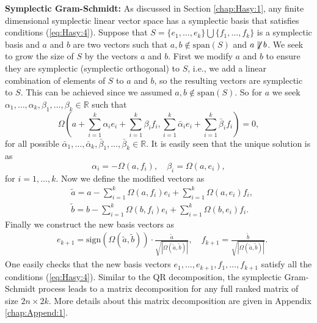 {\bf Symplectic Gram-Schmidt:} As discussed in Section \ref{chap:Hasy:1}, any finite dimensional symplectic linear vector space has a symplectic basis that satisfies conditions (\ref{eq:Hasy:4}). Suppose that $S=\{ e_1 , \dots , e_k \} \bigcup \{ f_1 , \dots , f_k \}$ is a symplectic basis and $a$ and $b$ are two vectors such that $a,b \not \in \text{span}(S)$ and $a \not \not \parallel b$. We seek to grow the size of $S$ by the vectors $a$ and $b$. First we modify $a$ and $b$ to ensure they are symplectic (symplectic orthogonal) to $S$, i.e., we add a linear combination of elements of $S$ to $a$ and $b$, so the resulting vectors are symplectic to $S$. This can be achieved since we assumed $a,b\not \in \text{span}(S)$. So for $a$ we seek $\alpha_1,\dots,\alpha_k,\beta_1,\dots,\beta_k \in \mathbb R$ such that
\begin{equation}
	\Omega\left(a + \sum_{i=1}^k \alpha_i e_i + \sum_{i=1}^k \beta_i f_i , \sum_{i=1}^k \bar{\alpha}_i e_i + \sum_{i=1}^k \bar{\beta}_i f_i \right) = 0,
\end{equation}
for all possible $\bar{\alpha}_1,\dots,\bar{\alpha}_k,\bar{\beta}_1,\dots,\bar{\beta}_k \in \mathbb R$. It is easily seen that the unique solution is as 
\begin{equation}
	\alpha_i = - \Omega(a,f_i), \quad \beta_i = \Omega(a,e_i),
\end{equation}
for $i=1,\dots,k$. Now we define the modified vectors as
\begin{equation}
\begin{aligned}
	& \tilde a = a - \sum_{i=1}^k \Omega(a,f_i) e_i + \sum_{i=1}^k \Omega(a,e_i) f_i, \\
	& \tilde b = b - \sum_{i=1}^k \Omega(b,f_i) e_i + \sum_{i=1}^k \Omega(b,e_i) f_i.
\end{aligned}
\end{equation}
Finally we construct the new basis vectors as
\begin{equation}
\begin{aligned}
	& e_{k+1} = \text{sign}(\Omega(\tilde a , \tilde b)) \cdot \frac{\tilde a}{ \sqrt{ |\Omega(\tilde a , \tilde b)| } }, \quad f_{k+1} = \frac{\tilde b}{ \sqrt{ |\Omega(\tilde a , \tilde b)| } }.
\end{aligned}
\end{equation}
One easily checks that the new basis vectors $e_1,\dots,e_{k+1},f_1,\dots,f_{k+1}$ satisfy all the conditions (\ref{eq:Hasy:4}). Similar to the QR decomposition, the symplectic Gram-Schmidt process leads to a matrix decomposition for any full ranked matrix of size $2n\times 2k$. More details about this matrix decomposition are given in Appendix \ref{chap:Append:1}.

